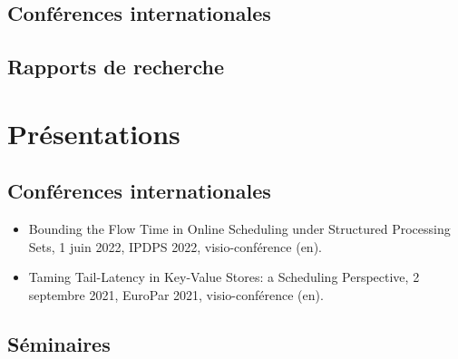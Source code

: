 \documentclass[12pt]{article}
\begin{document}
\subsection*{Conférences internationales}


\subsection*{Rapports de recherche}




\section*{Présentations}

\subsection*{Conférences internationales}

\begin{itemize}
  \item \foreignlanguage{english}{Bounding the Flow Time in Online Scheduling under Structured
  Processing Sets}, 1 juin 2022, IPDPS 2022, visio-conférence (en).
  \item \foreignlanguage{english}{Taming Tail-Latency in Key-Value Stores: a Scheduling
  Perspective}, 2 septembre 2021, EuroPar 2021, visio-conférence (en).
\end{itemize}

\subsection*{Séminaires}
\end{document}
